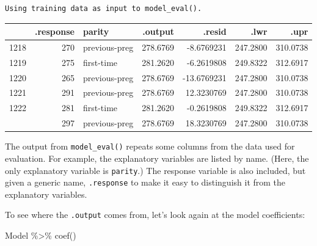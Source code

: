 \documentclass[
  letterpaper,
  DIV=11,
  numbers=noendperiod,
  oneside]{scrreprt}
\newenvironment{Shaded}{\begin{snugshade}}{\end{snugshade}}
\newcommand{\FunctionTok}[1]{\textcolor[rgb]{0.28,0.35,0.67}{#1}}
\newcommand{\NormalTok}[1]{\textcolor[rgb]{0.00,0.23,0.31}{#1}}
\newcommand{\SpecialCharTok}[1]{\textcolor[rgb]{0.37,0.37,0.37}{#1}}
\begin{document}
\begin{verbatim}
Using training data as input to model_eval().
\end{verbatim}

\ttfamily 
\begin{tabular}{lrlrrrr}
\toprule
  & .response & parity & .output & .resid & .lwr & .upr\\
\midrule
1218 & 270 & previous-preg & 278.6769 & -8.6769231 & 247.2800 & 310.0738\\
1219 & 275 & first-time & 281.2620 & -6.2619808 & 249.8322 & 312.6917\\
1220 & 265 & previous-preg & 278.6769 & -13.6769231 & 247.2800 & 310.0738\\
1221 & 291 & previous-preg & 278.6769 & 12.3230769 & 247.2800 & 310.0738\\
1222 & 281 & first-time & 281.2620 & -0.2619808 & 249.8322 & 312.6917\\
\addlinespace
1223 & 297 & previous-preg & 278.6769 & 18.3230769 & 247.2800 & 310.0738\\
\bottomrule
\end{tabular} \normalfont
\bigskip

\begin{tcolorbox}[enhanced jigsaw, colbacktitle=quarto-callout-note-color!10!white, breakable, opacitybacktitle=0.6, colback=white, left=2mm, arc=.35mm, colframe=quarto-callout-note-color-frame, coltitle=black, toprule=.15mm, opacityback=0, leftrule=.75mm, bottomtitle=1mm, toptitle=1mm, titlerule=0mm, title=\textcolor{quarto-callout-note-color}{\faInfo}\hspace{0.5em}{The \texttt{.response} variable}, rightrule=.15mm, bottomrule=.15mm]

The output from \texttt{model\_eval()} repeats some columns from the
data used for evaluation. For example, the explanatory variables are
listed by name. (Here, the only explanatory variable is
\texttt{parity}.) The response variable is also included, but given a
generic name, \texttt{.response} to make it easy to distinguish it from
the explanatory variables.

\end{tcolorbox}

To see where the \texttt{.output} comes from, let's look again at the
model coefficients:

\begin{Shaded}
\begin{Highlighting}[]
\NormalTok{Model }\SpecialCharTok{\%\textgreater{}\%} \FunctionTok{coef}\NormalTok{()}
\end{Highlighting}
\end{Shaded}
\end{document}
